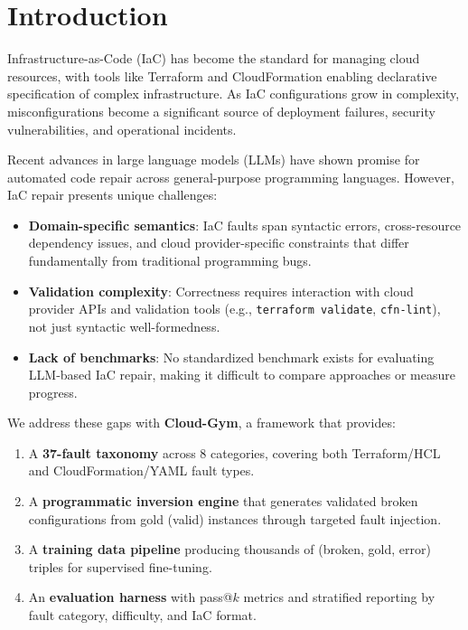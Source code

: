 \section{Introduction}
\label{sec:introduction}

Infrastructure-as-Code (IaC) has become the standard for managing cloud resources, with tools like Terraform and CloudFormation enabling declarative specification of complex infrastructure. As IaC configurations grow in complexity, misconfigurations become a significant source of deployment failures, security vulnerabilities, and operational incidents.

Recent advances in large language models (LLMs) have shown promise for automated code repair across general-purpose programming languages. However, IaC repair presents unique challenges:
\begin{itemize}
    \item \textbf{Domain-specific semantics}: IaC faults span syntactic errors, cross-resource dependency issues, and cloud provider-specific constraints that differ fundamentally from traditional programming bugs.
    \item \textbf{Validation complexity}: Correctness requires interaction with cloud provider APIs and validation tools (e.g., \texttt{terraform validate}, \texttt{cfn-lint}), not just syntactic well-formedness.
    \item \textbf{Lack of benchmarks}: No standardized benchmark exists for evaluating LLM-based IaC repair, making it difficult to compare approaches or measure progress.
\end{itemize}

We address these gaps with \textbf{Cloud-Gym}, a framework that provides:
\begin{enumerate}
    \item A \textbf{37-fault taxonomy} across 8 categories, covering both Terraform/HCL and CloudFormation/YAML fault types.
    \item A \textbf{programmatic inversion engine} that generates validated broken configurations from gold (valid) instances through targeted fault injection.
    \item A \textbf{training data pipeline} producing thousands of (broken, gold, error) triples for supervised fine-tuning.
    \item An \textbf{evaluation harness} with pass@$k$ metrics and stratified reporting by fault category, difficulty, and IaC format.
\end{enumerate}

